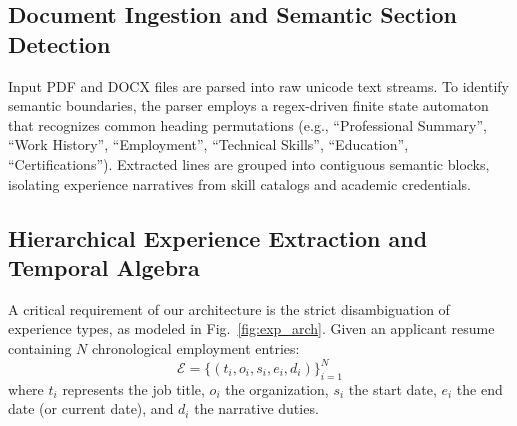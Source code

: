 \documentclass[conference]{IEEEtran}
\begin{document}
\subsection{Document Ingestion and Semantic Section Detection}
Input PDF and DOCX files are parsed into raw unicode text streams. To identify semantic boundaries, the parser employs a regex-driven finite state automaton that recognizes common heading permutations (e.g., ``Professional Summary'', ``Work History'', ``Employment'', ``Technical Skills'', ``Education'', ``Certifications''). Extracted lines are grouped into contiguous semantic blocks, isolating experience narratives from skill catalogs and academic credentials.

\subsection{Hierarchical Experience Extraction and Temporal Algebra}
A critical requirement of our architecture is the strict disambiguation of experience types, as modeled in Fig.~\ref{fig:exp_arch}. Given an applicant resume containing $N$ chronological employment entries:
\begin{equation}
\mathcal{E} = \{(t_i, o_i, s_i, e_i, d_i)\}_{i=1}^{N}
\end{equation}
where $t_i$ represents the job title, $o_i$ the organization, $s_i$ the start date, $e_i$ the end date (or current date), and $d_i$ the narrative duties.
\end{document}
